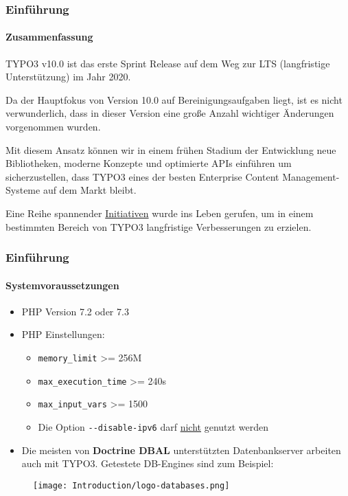 \begin{frame}[fragile]
	\frametitle{Einführung}
	\framesubtitle{Zusammenfassung}

	\small
		TYPO3 v10.0 ist das erste Sprint Release auf dem Weg zur LTS
		(langfristige Unterstützung) im Jahr 2020.

		\vspace{0.2cm}

		Da der Hauptfokus von Version 10.0 auf Bereinigungsaufgaben liegt, ist es nicht
		verwunderlich, dass in dieser Version eine große Anzahl wichtiger Änderungen vorgenommen wurden.

		\vspace{0.2cm}

		Mit diesem Ansatz können wir in einem frühen Stadium der Entwicklung neue Bibliotheken, moderne 
		Konzepte und optimierte APIs einführen um sicherzustellen, dass TYPO3 eines der besten 
		Enterprise Content Management-Systeme auf dem Markt bleibt.

		\vspace{0.2cm}

		Eine Reihe spannender 
		\href{https://typo3.org/community/teams/typo3-development/initiatives/}{Initiativen}
		wurde ins Leben gerufen, um in einem bestimmten Bereich von TYPO3 langfristige Verbesserungen zu 
		erzielen.
	\normalsize

\end{frame}


\begin{frame}[fragile]
	\frametitle{Einführung}
	\framesubtitle{Systemvoraussetzungen}

	\begin{itemize}
		\item PHP Version 7.2 oder 7.3
		\item PHP Einstellungen:

			\begin{itemize}
				\item \texttt{memory\_limit} >= 256M
				\item \texttt{max\_execution\_time} >= 240s
				\item \texttt{max\_input\_vars} >= 1500
				\item Die Option \texttt{-}\texttt{-disable-ipv6} darf \underline{nicht} genutzt werden
			\end{itemize}

		\item Die meisten von \textbf{Doctrine DBAL} unterstützten Datenbankserver arbeiten auch mit TYPO3.
			Getestete DB-Engines sind zum Beispiel:
	\end{itemize}

	\begin{figure}
		\texttt{[image: Introduction/logo-databases.png]}
	\end{figure}

\end{frame}

